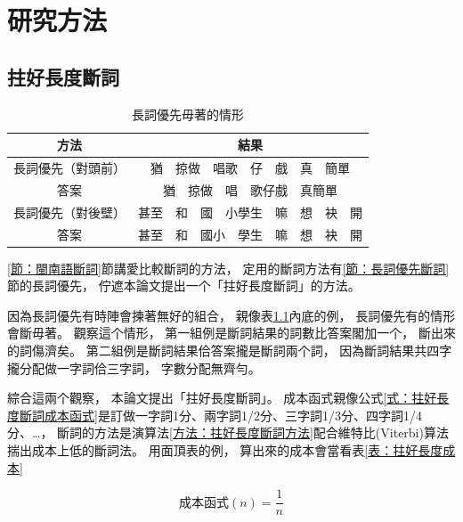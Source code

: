 \chapter{研究方法}
\label{章：研究方法}

\section{拄好長度斷詞}
\label{節：拄好長度斷詞}

\begin{table}
\caption{長詞優先毋著的情形}
\label{表：長詞優先佇一寡例有問題}
\centering
\begin{tabular}{c|c}
方法 & 結果\\
\hline
長詞優先（對頭前） & 猶　掠做　唱歌　仔　戲　真　簡單\\
答案 & 猶　掠做　唱　歌仔戲　真簡單\\
\hline
長詞優先（對後壁） & 甚至　和　國　小學生　嘛　想　袂　開\\
答案 & 甚至　和　國小　學生　嘛　想　袂　開\\
\end{tabular}
\end{table}

\ref{節：閩南語斷詞}節講愛比較斷詞的方法，
定用的斷詞方法有\ref{節：長詞優先斷詞}節的長詞優先，
佇遮本論文提出一个「拄好長度斷詞」的方法。


因為長詞優先有時陣會揀著無好的組合，
親像表\ref{表：長詞優先佇一寡例有問題}內底的例，
長詞優先有的情形會斷毋著。
觀察這个情形，
第一組例是斷詞結果的詞數比答案閣加一个，
斷出來的詞傷濟矣。
第二組例是斷詞結果佮答案攏是斷詞兩个詞，
因為斷詞結果共四字攏分配做一字詞佮三字詞，
字數分配無齊勻。

綜合這兩个觀察，
本論文提出「拄好長度斷詞」。
成本函式親像公式\ref{式：拄好長度斷詞成本函式}是訂做一字詞1分、兩字詞1/2分、三字詞1/3分、四字詞1/4分、…，
斷詞的方法是演算法\ref{方法：拄好長度斷詞方法}配合維特比(Viterbi)算法揣出成本上低的斷詞法。
用面頂表的例，
算出來的成本會當看表\ref{表：拄好長度成本}

\begin{equation}
\label{式：拄好長度斷詞成本函式}
成本函式(n) = \frac{1}{n}
\end{equation}

